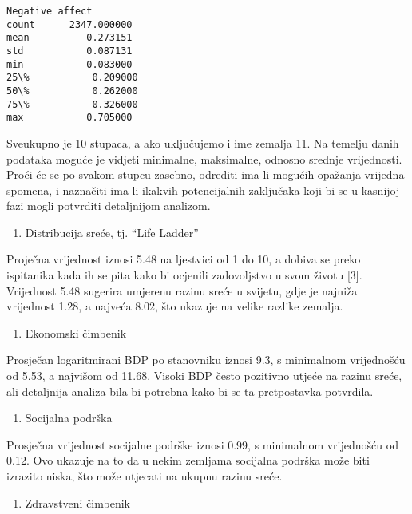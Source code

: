 \documentclass[11pt]{article}
\providecommand{\tightlist}{%
      \setlength{\itemsep}{0pt}\setlength{\parskip}{0pt}}
\begin{document}
\begin{Verbatim}[commandchars=\\\{\}]
       Negative affect
count      2347.000000
mean          0.273151
std           0.087131
min           0.083000
25\%           0.209000
50\%           0.262000
75\%           0.326000
max           0.705000
    \end{Verbatim}

    Sveukupno je 10 stupaca, a ako uključujemo i ime zemalja 11. Na temelju
danih podataka moguće je vidjeti minimalne, maksimalne, odnosno srednje
vrijednosti. Proći će se po svakom stupcu zasebno, odrediti ima li
mogućih opažanja vrijedna spomena, i naznačiti ima li ikakvih
potencijalnih zaključaka koji bi se u kasnijoj fazi mogli potvrditi
detaljnijom analizom.

\begin{enumerate}
\def\labelenumi{\arabic{enumi}.}
\tightlist
\item
  Distribucija sreće, tj. ``Life Ladder''
\end{enumerate}

Proječna vrijednost iznosi 5.48 na ljestvici od 1 do 10, a dobiva se
preko ispitanika kada ih se pita kako bi ocjenili zadovoljstvo u svom
životu {[}3{]}. Vrijednost 5.48 sugerira umjerenu razinu sreće u
svijetu, gdje je najniža vrijednost 1.28, a najveća 8.02, što ukazuje na
velike razlike zemalja.

\begin{enumerate}
\def\labelenumi{\arabic{enumi}.}
\setcounter{enumi}{1}
\tightlist
\item
  Ekonomski čimbenik
\end{enumerate}

Prosječan logaritmirani BDP po stanovniku iznosi 9.3, s minimalnom
vrijednošću od 5.53, a najvišom od 11.68. Visoki BDP često pozitivno
utjeće na razinu sreće, ali detaljnija analiza bila bi potrebna kako bi
se ta pretpostavka potvrdila.

\begin{enumerate}
\def\labelenumi{\arabic{enumi}.}
\setcounter{enumi}{2}
\tightlist
\item
  Socijalna podrška
\end{enumerate}

Prosječna vrijednost socijalne podrške iznosi 0.99, s minimalnom
vrijednošću od 0.12. Ovo ukazuje na to da u nekim zemljama socijalna
podrška može biti izrazito niska, što može utjecati na ukupnu razinu
sreće.

\begin{enumerate}
\def\labelenumi{\arabic{enumi}.}
\setcounter{enumi}{3}
\tightlist
\item
  Zdravstveni čimbenik
\end{enumerate}
\end{document}
